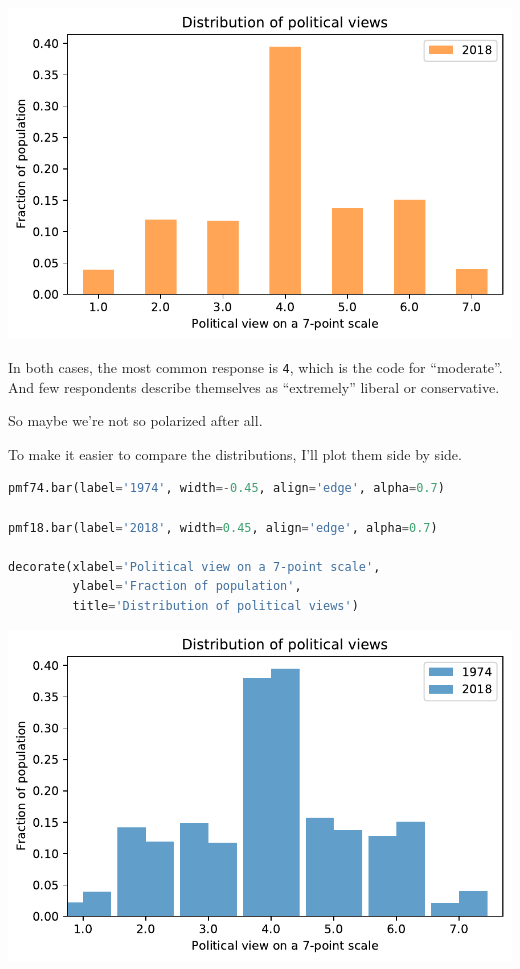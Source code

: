 \begin{center}
\includegraphics[scale=0.75]{02_polviews_files/02_polviews_32_0.pdf}
\end{center}

In both cases, the most common response is \passthrough{\lstinline!4!},
which is the code for ``moderate''. And few respondents describe
themselves as ``extremely'' liberal or conservative.

So maybe we're not so polarized after all.

To make it easier to compare the distributions, I'll plot them side by
side.

\begin{lstlisting}[language=Python]
pmf74.bar(label='1974', width=-0.45, align='edge', alpha=0.7)

pmf18.bar(label='2018', width=0.45, align='edge', alpha=0.7)

decorate(xlabel='Political view on a 7-point scale',
         ylabel='Fraction of population',
         title='Distribution of political views')
\end{lstlisting}

\begin{center}
\includegraphics[scale=0.75]{02_polviews_files/02_polviews_34_0.pdf}
\end{center}

